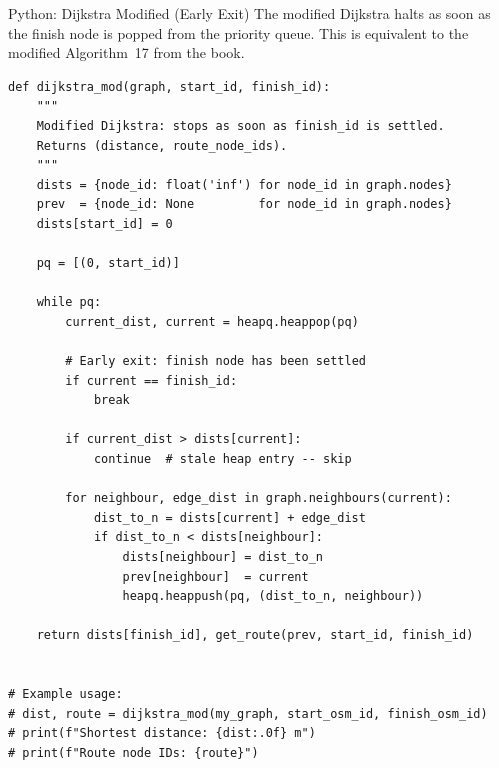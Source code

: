 \documentclass[aspectratio=169,10pt]{beamer}
\begin{document}
\begin{frame}[fragile]{Python: Dijkstra Modified (Early Exit)}
  The modified Dijkstra halts as soon as the finish node is popped from
  the priority queue.  This is equivalent to the modified Algorithm~17
  from the book.

\begin{lstlisting}[style=pythoncode]
def dijkstra_mod(graph, start_id, finish_id):
    """
    Modified Dijkstra: stops as soon as finish_id is settled.
    Returns (distance, route_node_ids).
    """
    dists = {node_id: float('inf') for node_id in graph.nodes}
    prev  = {node_id: None         for node_id in graph.nodes}
    dists[start_id] = 0

    pq = [(0, start_id)]

    while pq:
        current_dist, current = heapq.heappop(pq)

        # Early exit: finish node has been settled
        if current == finish_id:
            break

        if current_dist > dists[current]:
            continue  # stale heap entry -- skip

        for neighbour, edge_dist in graph.neighbours(current):
            dist_to_n = dists[current] + edge_dist
            if dist_to_n < dists[neighbour]:
                dists[neighbour] = dist_to_n
                prev[neighbour]  = current
                heapq.heappush(pq, (dist_to_n, neighbour))

    return dists[finish_id], get_route(prev, start_id, finish_id)


# Example usage:
# dist, route = dijkstra_mod(my_graph, start_osm_id, finish_osm_id)
# print(f"Shortest distance: {dist:.0f} m")
# print(f"Route node IDs: {route}")
\end{lstlisting}
\end{frame}
\end{document}
